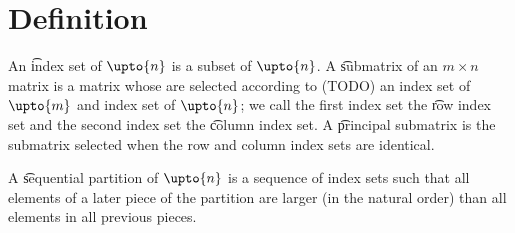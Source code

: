 

\section*{Definition}

An \t{index set} of $\upto{n}$ is a subset of $\upto{n}$.
A \t{submatrix} of an $m \times n$ matrix is a matrix whose are selected according to (TODO) an index set of $\upto{m}$ and index set of $\upto{n}$; we call the first index set the \t{row index set} and the second index set the \t{column index set}.
A \t{principal submatrix} is the submatrix selected when the row and column index sets are identical.

A \t{sequential partition} of $\upto{n}$ is a sequence of index sets such that all elements of a later piece of the partition are larger (in the natural order) than all elements in all previous pieces.


\blankpage